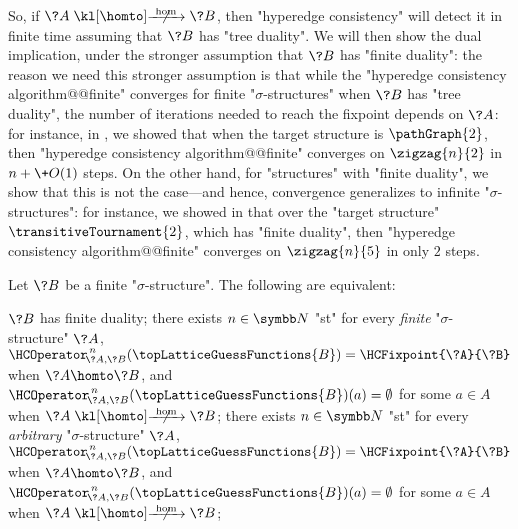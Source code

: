 So, if $\?A \nothomto \?B$, then "hyperedge consistency" will detect it in finite time assuming 
that $\?B$ has "tree duality".
We will then show the dual implication, under the stronger assumption that $\?B$ has "finite 
duality": the reason we need this stronger assumption is that while the "hyperedge consistency algorithm@@finite" converges for finite "$\sigma$-structures" when $\?B$ has "tree duality",
the number of iterations needed to reach the fixpoint depends on $\?A$:
for instance, in , we showed that when the target structure
is $\pathGraph{2}$, then "hyperedge consistency algorithm@@finite" converges
on $\zigzag{n}{2}$ in $n + \+O(1)$ steps.
On the other hand, for "structures"
with "finite duality", we show that this is not the case---and hence, convergence generalizes to 
infinite "$\sigma$-structures": for instance, we showed in 
that over the "target structure" $\transitiveTournament{2}$, which has "finite duality", 
then "hyperedge consistency algorithm@@finite" converges
on $\zigzag{n}{5}$ in only $2$ steps.

\begin{lemma}
	\AP\label{lem:hyperedge-consistency-uniform-convergence}
	Let $\?B$ be a finite "$\sigma$-structure".
	The following are equivalent:
	\begin{enumerate}
		\itemAP\label{item:hc-uniform-finite-duality}%
			$\?B$ has finite duality;
		\itemAP\label{item:hc-uniform-finite-structures}%
			there exists $n\in\N$ "st" for every \emph{finite} "$\sigma$-structure" $\?A$, $\HCOperator^{\,n}_{\!\?A,\?B}(\topLatticeGuessFunctions{B}) = \HCFixpoint{\?A}{\?B}$
			when $\?A \homto \?B$, and
			$\HCOperator^{\,n}_{\!\?A,\?B}(\topLatticeGuessFunctions{B})(a) = \emptyset$ for some $a\in A$ when $\?A \nothomto \?B$;
		\itemAP\label{item:hc-uniform-arbitrary-structures}%
			there exists $n\in\N$ "st" for every \emph{arbitrary} "$\sigma$-structure" $\?A$, $\HCOperator^{\,n}_{\!\?A,\?B}(\topLatticeGuessFunctions{B}) = \HCFixpoint{\?A}{\?B}$
			when $\?A \homto \?B$, and
			$\HCOperator^{\,n}_{\!\?A,\?B}(\topLatticeGuessFunctions{B})(a) = \emptyset$ for some $a\in A$ when $\?A \nothomto \?B$;
	\end{enumerate}
\end{lemma}

